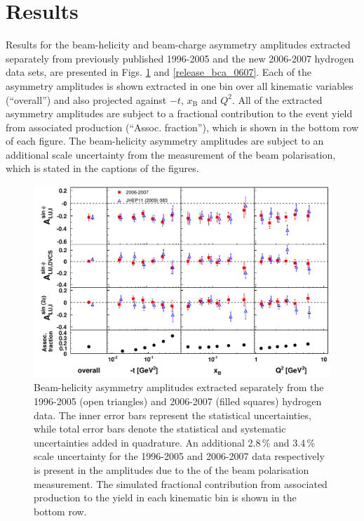 \section{Results}
Results for the beam-helicity and beam-charge asymmetry amplitudes extracted separately from  previously published 1996-2005 and the new 2006-2007 hydrogen data sets, are presented in Figs. \ref{release_bsa_0607} and \ref{release_bca_0607}. Each of the asymmetry amplitudes is shown extracted in one bin over all kinematic variables (``overall'') and also projected against $-t$, $x_{\textrm{B}}$ and $Q^{2}$. All of the extracted asymmetry amplitudes are subject to a fractional contribution to the event yield from associated production (``Assoc. fraction''), which is shown in the bottom row of each figure. The beam-helicity asymmetry amplitudes are subject to an additional scale uncertainty from the measurement of the beam polarisation, which is stated in the captions of the figures.
\begin{figure}
\begin{center}
\includegraphics[width=15cm,keepaspectratio]{bsadvcsplots_eml_par13_bin6_pic_0607_9605_cluster}
  \caption{Beam-helicity asymmetry amplitudes extracted separately from
the 1996-2005 (open triangles) and 2006-2007 (filled squares)
hydrogen data. The inner error bars represent the statistical uncertainties, while total error bars denote the statistical and systematic uncertainties added in quadrature.  
An additional 2.8\,\% and 3.4\,\% scale uncertainty for the 1996-2005 and
2006-2007 data respectively is present in the amplitudes due to the  of
the beam polarisation measurement. The simulated fractional contribution from associated production to the yield in each kinematic bin is shown in the bottom row.}
 \label{release_bsa_0607}
\end{center}
 \end{figure}

